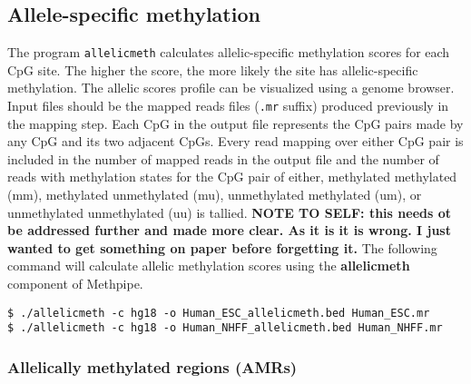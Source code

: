 \documentclass[10pt]{article}
\newcommand{\prog}[1]{\texttt{#1}}
\newcommand{\fn}[1]{\texttt{#1}}
\begin{document}


\subsection{Allele-specific methylation}
\label{sec:allelic_scores}

The program \prog{allelicmeth} calculates allelic-specific
methylation scores for each CpG site. The higher the score, the more
likely the site has allelic-specific methylation. The allelic scores
profile can be visualized using a genome browser. Input files should
be the mapped reads files (\fn{.mr} suffix) produced previously in the
mapping step. Each CpG in the output file represents the CpG pairs
made by any CpG and its two adjacent CpGs. Every read mapping over
either CpG pair is included in the number of mapped reads in the
output file and the number of reads with methylation states for the
CpG pair of either, methylated methylated (mm), methylated
unmethylated (mu), unmethylated methylated (um), or unmethylated
unmethylated (uu) is tallied. \textbf {NOTE TO SELF: this needs ot be
  addressed further and made more clear. As it is it is wrong. I just
  wanted to get something on paper before forgetting it.}  The
following command will calculate allelic methylation scores using the
\textbf{allelicmeth} component of Methpipe.
\begin{verbatim}
$ ./allelicmeth -c hg18 -o Human_ESC_allelicmeth.bed Human_ESC.mr
$ ./allelicmeth -c hg18 -o Human_NHFF_allelicmeth.bed Human_NHFF.mr
\end{verbatim}

\subsubsection{Allelically methylated regions (AMRs)}
\end{document}
